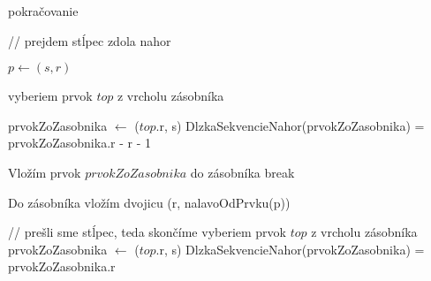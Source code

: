 \begin{algorithm}

\caption{pokračovanie}
\begin{algorithmic}

	
	
	\STATE // prejdem stĺpec zdola nahor

		\STATE $p \leftarrow (s, r)$
		
			\STATE vyberiem prvok $top$ z vrcholu zásobníka
						
				\STATE prvokZoZasobnika $\leftarrow$ ($top$.r, s)
				\STATE DlzkaSekvencieNahor(prvokZoZasobnika) = prvokZoZasobnika.r - r - 1
			
			\ELSE
				\STATE Vložím prvok $prvokZoZasobnika$ do zásobníka
				\STATE break
			\ENDIF
		\ENDWHILE
		
		\STATE Do zásobníka vložím dvojicu (r, nalavoOdPrvku(p))
	\ENDFOR
	
	\STATE // prešli sme stĺpec, teda skončíme
		\STATE vyberiem prvok $top$ z vrcholu zásobníka
		\STATE prvokZoZasobnika $\leftarrow$ ($top$.r, s)
		\STATE DlzkaSekvencieNahor(prvokZoZasobnika) = prvokZoZasobnika.r
		
	\ENDWHILE


\end{algorithmic}
\end{algorithm}